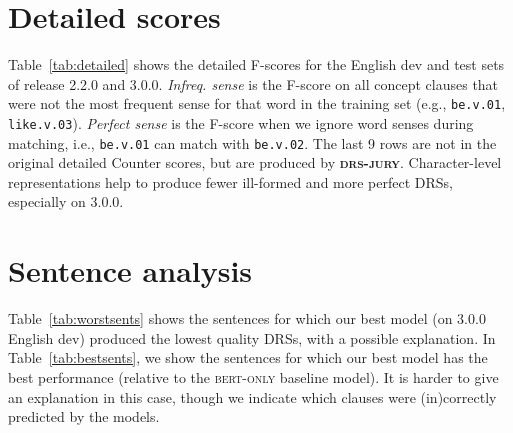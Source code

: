 \documentclass[11pt,a4paper]{article}
\newcommand{\bertonly}{\textsc{bert-only}}
\newcommand{\drseval}{\textbf{\textsc{drs-jury}}}
\begin{document}
\section{Detailed scores}
\label{app:detailed}

Table~\ref{tab:detailed} shows the detailed F-scores for the English dev and test sets of release 2.2.0 and 3.0.0. \emph{Infreq. sense} is the F-score on all concept clauses that were not the most frequent sense for that word in the training set (e.g., \texttt{be.v.01}, \texttt{like.v.03}). \emph{Perfect sense} is the F-score when we ignore word senses during matching, i.e., \texttt{be.v.01} can match with \texttt{be.v.02}. The last 9 rows are not in the original detailed Counter scores, but are produced by \drseval. Character-level representations help to produce fewer ill-formed and more perfect DRSs, especially on 3.0.0.


\section{Sentence analysis}
\label{app:sents}

Table~\ref{tab:worstsents} shows the sentences for which our best model (on 3.0.0 English dev) produced the lowest quality DRSs, with a possible explanation. In Table~\ref{tab:bestsents}, we show the sentences for which our best model has the best performance (relative to the \bertonly{} baseline model). It is harder to give an explanation in this case, though we indicate which clauses were (in)correctly predicted by the models.
\end{document}
